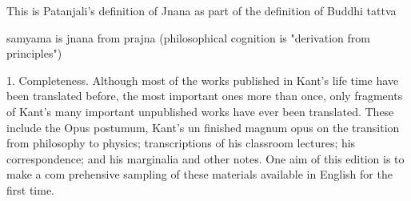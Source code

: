 This is Patanjali's definition of Jnana as part of the definition of Buddhi tattva

samyama is jnana from prajna (philosophical cognition is "derivation from principles")

1. Completeness. Although most of the works published in Kant's life­
time have been translated before, the most important ones more than
once, only fragments of Kant's many important unpublished works
have ever been translated. These include the Opus postumum, Kant's un­
finished magnum opus on the transition from philosophy to physics;
transcriptions of his classroom lectures; his correspondence; and his
marginalia and other notes. One aim of this edition is to make a com­
prehensive sampling of these materials available in English for the first
time.